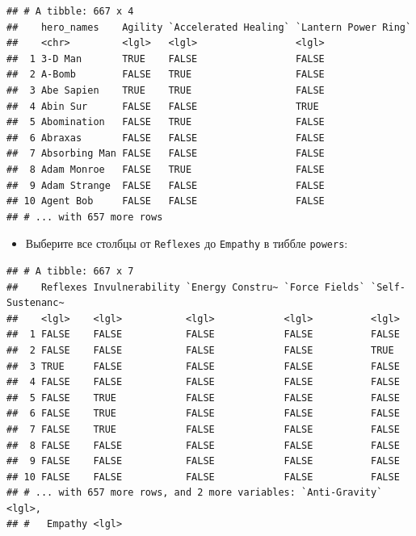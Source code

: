 \documentclass[]{book}
\newenvironment{Shaded}{\begin{snugshade}}{\end{snugshade}}
\newcommand{\KeywordTok}[1]{\textcolor[rgb]{0.13,0.29,0.53}{\textbf{#1}}}
\newcommand{\DecValTok}[1]{\textcolor[rgb]{0.00,0.00,0.81}{#1}}
\newcommand{\StringTok}[1]{\textcolor[rgb]{0.31,0.60,0.02}{#1}}
\newcommand{\OperatorTok}[1]{\textcolor[rgb]{0.81,0.36,0.00}{\textbf{#1}}}
\newcommand{\NormalTok}[1]{#1}
\providecommand{\tightlist}{%
  \setlength{\itemsep}{0pt}\setlength{\parskip}{0pt}}
\begin{document}
\begin{Shaded}
\end{Shaded}

\begin{verbatim}
## # A tibble: 667 x 4
##    hero_names    Agility `Accelerated Healing` `Lantern Power Ring`
##    <chr>         <lgl>   <lgl>                 <lgl>               
##  1 3-D Man       TRUE    FALSE                 FALSE               
##  2 A-Bomb        FALSE   TRUE                  FALSE               
##  3 Abe Sapien    TRUE    TRUE                  FALSE               
##  4 Abin Sur      FALSE   FALSE                 TRUE                
##  5 Abomination   FALSE   TRUE                  FALSE               
##  6 Abraxas       FALSE   FALSE                 FALSE               
##  7 Absorbing Man FALSE   FALSE                 FALSE               
##  8 Adam Monroe   FALSE   TRUE                  FALSE               
##  9 Adam Strange  FALSE   FALSE                 FALSE               
## 10 Agent Bob     FALSE   FALSE                 FALSE               
## # ... with 657 more rows
\end{verbatim}

\begin{itemize}
\tightlist
\item
  Выберите все столбцы от \texttt{Reflexes} до \texttt{Empathy} в тиббле
  \texttt{powers}:
\end{itemize}

\begin{Shaded}
\end{Shaded}

\begin{verbatim}
## # A tibble: 667 x 7
##    Reflexes Invulnerability `Energy Constru~ `Force Fields` `Self-Sustenanc~
##    <lgl>    <lgl>           <lgl>            <lgl>          <lgl>           
##  1 FALSE    FALSE           FALSE            FALSE          FALSE           
##  2 FALSE    FALSE           FALSE            FALSE          TRUE            
##  3 TRUE     FALSE           FALSE            FALSE          FALSE           
##  4 FALSE    FALSE           FALSE            FALSE          FALSE           
##  5 FALSE    TRUE            FALSE            FALSE          FALSE           
##  6 FALSE    TRUE            FALSE            FALSE          FALSE           
##  7 FALSE    TRUE            FALSE            FALSE          FALSE           
##  8 FALSE    FALSE           FALSE            FALSE          FALSE           
##  9 FALSE    FALSE           FALSE            FALSE          FALSE           
## 10 FALSE    FALSE           FALSE            FALSE          FALSE           
## # ... with 657 more rows, and 2 more variables: `Anti-Gravity` <lgl>,
## #   Empathy <lgl>
\end{verbatim}
\end{document}

